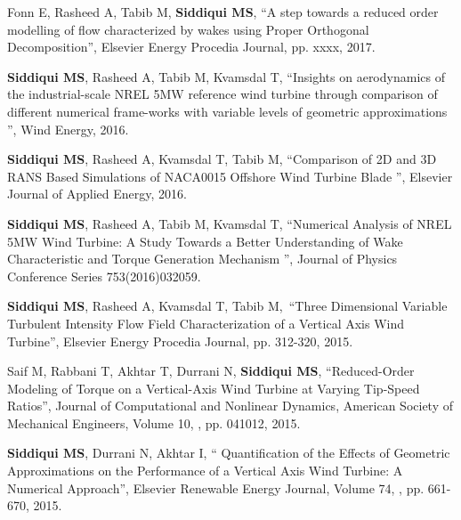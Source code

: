 \begin{cventries}
{\begin{cvitems}
\item {Fonn E, Rasheed A, Tabib M, \textbf{Siddiqui MS}, “A step towards a reduced order modelling of flow characterized by wakes using Proper Orthogonal Decomposition”, Elsevier Energy Procedia Journal, pp. xxxx, 2017.}
\item{\textbf{Siddiqui MS}, Rasheed A, Tabib M, Kvamsdal T, “Insights on aerodynamics of the industrial-scale NREL 5MW reference wind turbine through comparison of different numerical frame-works with variable levels of geometric approximations ”, Wind Energy, 2016.}
\item{\textbf{Siddiqui MS}, Rasheed A, Kvamsdal T, Tabib M, “Comparison of 2D and 3D RANS Based Simulations of NACA0015 Offshore Wind Turbine Blade  ”, Elsevier Journal of Applied Energy, 2016.}
\item{\textbf{Siddiqui MS}, Rasheed A, Tabib M, Kvamsdal T, “Numerical Analysis of NREL 5MW Wind Turbine: A Study Towards a Better Understanding of Wake Characteristic and Torque Generation Mechanism ”, Journal of Physics Conference Series 753(2016)032059.}
\item {\textbf{Siddiqui MS}, Rasheed A, Kvamsdal T, Tabib M, “Three Dimensional Variable Turbulent Intensity Flow Field Characterization of a Vertical Axis Wind Turbine”, Elsevier Energy Procedia Journal, pp. 312-320, 2015.}
\item {Saif M, Rabbani T, Akhtar T, Durrani N, \textbf{Siddiqui MS}, “Reduced-Order Modeling of Torque on a Vertical-Axis Wind Turbine at Varying Tip-Speed Ratios”, Journal of Computational and Nonlinear Dynamics, American Society of Mechanical Engineers, Volume 10, , pp. 041012, 2015.}
\item {\textbf{Siddiqui MS}, Durrani N, Akhtar I, “ Quantification of the Effects of Geometric Approximations on the Performance of a Vertical Axis Wind Turbine: A Numerical Approach”, Elsevier Renewable Energy Journal, Volume 74, , pp. 661-670, 2015.}
\end{cvitems}
    }
\end{cventries}
